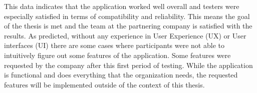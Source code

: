 This data indicates that the application worked well overall and testers 
were especially satisfied in terms of compatibility and reliability. 
This means the goal of the thesis is met and the team at the partnering company is satisfied with the results. 
As predicted, without any experience in User Experience (UX) or User interfaces (UI) there are some cases where participants were not able to intuitively figure out some features of the application. 
Some features were requested by the company after this first period of testing. 
While the application is functional and does everything that the organization needs, 
the requested features will be implemented outside of the context of this thesis. 
